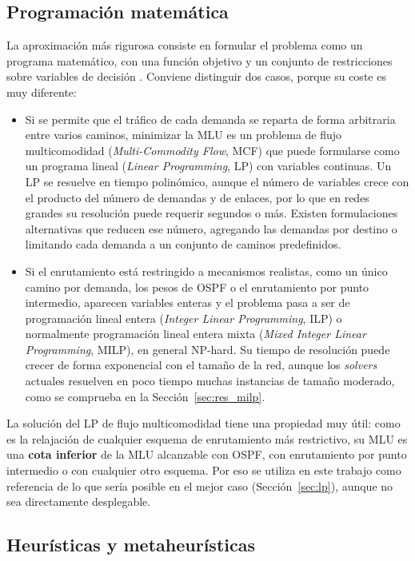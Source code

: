 \subsection{Programación matemática}\label{sec:prog_mat}

La aproximación más rigurosa consiste en formular el problema como un programa matemático, con una función objetivo y un conjunto de restricciones sobre variables de decisión \cite{zhu2021network}. Conviene distinguir dos casos, porque su coste es muy diferente:

\begin{itemize}
	\item Si se permite que el tráfico de cada demanda se reparta de forma arbitraria entre varios caminos, minimizar la MLU es un problema de flujo multicomodidad (\textit{Multi-Commodity Flow}, MCF) que puede formularse como un programa lineal (\textit{Linear Programming}, LP) con variables continuas. Un LP se resuelve en tiempo polinómico, aunque el número de variables crece con el producto del número de demandas y de enlaces, por lo que en redes grandes su resolución puede requerir segundos o más. Existen formulaciones alternativas que reducen ese número, agregando las demandas por destino o limitando cada demanda a un conjunto de caminos predefinidos.
	\item Si el enrutamiento está restringido a mecanismos realistas, como un único camino por demanda, los pesos de OSPF o el enrutamiento por punto intermedio, aparecen variables enteras y el problema pasa a ser de programación lineal entera (\textit{Integer Linear Programming}, ILP) o normalmente programación lineal entera mixta (\textit{Mixed Integer Linear Programming}, MILP), en general NP-hard. Su tiempo de resolución puede crecer de forma exponencial con el tamaño de la red, aunque los \textit{solvers} actuales resuelven en poco tiempo muchas instancias de tamaño moderado, como se comprueba en la Sección~\ref{sec:res_milp}.
\end{itemize}

La solución del LP de flujo multicomodidad tiene una propiedad muy útil: como es la relajación de cualquier esquema de enrutamiento más restrictivo, su MLU es una \textbf{cota inferior} de la MLU alcanzable con OSPF, con enrutamiento por punto intermedio o con cualquier otro esquema. Por eso se utiliza en este trabajo como referencia de lo que sería posible en el mejor caso (Sección~\ref{sec:lp}), aunque no sea directamente desplegable.

\subsection{Heurísticas y metaheurísticas}\label{sec:heuristicas}

